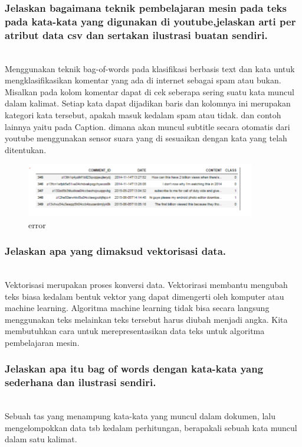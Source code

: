 	\subsubsection{Jelaskan bagaimana teknik pembelajaran mesin pada teks pada kata-kata yang digunakan di youtube,jelaskan arti per atribut data csv dan sertakan ilustrasi buatan sendiri.}\hfill\\
Menggunakan teknik bag-of-words pada klasiﬁkasi berbasis text dan kata untuk mengklasiﬁkasikan komentar yang ada di internet sebagai spam atau bukan. Misalkan pada kolom komentar dapat di cek seberapa sering suatu kata muncul dalam kalimat. Setiap kata dapat dijadikan baris dan kolomnya ini merupakan kategori kata tersebut, apakah masuk kedalam spam atau tidak. dan contoh lainnya yaitu pada Caption. dimana akan muncul subtitle secara otomatis dari youtube menggunakan sensor suara yang di sesuaikan dengan kata yang telah ditentukan.

	\begin{figure}[H]
		\begin{center}
		 \includegraphics[width=10cm]{figures/1174076/figures4/3.png}
		 \caption{error}	
		\end{center}
	\end{figure}
	
	\subsubsection{Jelaskan apa yang dimaksud vektorisasi data.}\hfill\\
Vektorisasi merupakan proses konversi data. Vektorirasi membantu mengubah teks biasa kedalam bentuk vektor yang dapat dimengerti oleh komputer atau machine learning. Algoritma machine learning tidak bisa secara langsung menggunakan teks melainkan teks tersebut harus diubah menjadi angka. Kita membutuhkan cara untuk merepresentasikan data teks untuk algoritma pembelajaran mesin.
	
	\subsubsection{Jelaskan apa itu bag of words dengan kata-kata yang sederhana dan ilustrasi sendiri.} \hfill\\
Sebuah tas yang menampung kata-kata yang muncul dalam dokumen, lalu mengelompokkan data tsb kedalam perhitungan, berapakali sebuah kata muncul dalam satu kalimat.
	
